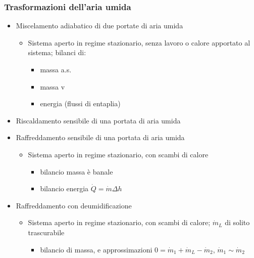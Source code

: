 \documentclass[letterpaper,10pt,italian]{jupyterBook}
\begin{document}
\subsubsection{Trasformazioni dell’aria umida}
\label{\detokenize{ch/thermodynamics/humid-air:trasformazioni-dell-aria-umida}}\begin{itemize}
\item {} 
\sphinxAtStartPar
Miscelamento adiabatico di due portate di aria umida
\begin{itemize}
\item {} 
\sphinxAtStartPar
Sistema aperto in regime stazionario, senza lavoro o calore apportato al sistema; bilanci di:
\begin{itemize}
\item {} 
\sphinxAtStartPar
massa a.s.

\item {} 
\sphinxAtStartPar
massa v

\item {} 
\sphinxAtStartPar
energia (flussi di entaplia)

\end{itemize}

\end{itemize}

\item {} 
\sphinxAtStartPar
Riscaldamento sensibile di una portata di aria umida

\item {} 
\sphinxAtStartPar
Raffreddamento sensibile di una portata di aria umida
\begin{itemize}
\item {} 
\sphinxAtStartPar
Sistema aperto in regime stazionario, con scambi di calore
\begin{itemize}
\item {} 
\sphinxAtStartPar
bilancio massa è banale

\item {} 
\sphinxAtStartPar
bilancio energia \(\dot{Q} = \dot{m} \Delta h\)

\end{itemize}

\end{itemize}

\item {} 
\sphinxAtStartPar
Raffreddamento con deumidificazione
\begin{itemize}
\item {} 
\sphinxAtStartPar
Sistema aperto in regime stazionario, con scambi di calore; \(\dot{m}_L\) di solito trascurabile
\begin{itemize}
\item {} 
\sphinxAtStartPar
bilancio di massa, e approssimazioni \(0 = \dot{m}_1 + \dot{m}_L - \dot{m}_2\), \(\dot{m}_1 \sim \dot{m}_2\)


\end{itemize}
\end{itemize}
\end{itemize}
\end{document}
